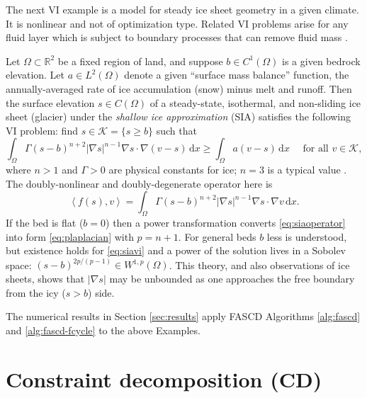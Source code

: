 \documentclass[review,hidelinks,onefignum,onetabnum]{siamart220329}
\newcommand{\RR}{\mathbb{R}}
\newcommand{\grad}{\nabla}
\newcommand{\ip}[2]{\left<#1,#2\right>}
\newcommand{\dx}{\, \mathrm{d}x}
\begin{document}
The next VI example is a model for steady ice sheet geometry in a given climate. It is nonlinear and not of optimization type. Related VI problems arise for any fluid layer which is subject to boundary processes that can remove fluid mass \cite{Bueler2021conservation}.

\begin{example}  \label{ex:sia}  Let $\Omega \subset \RR^2$ be a fixed region of land, and suppose $b \in C^1(\Omega)$ is a given bedrock elevation.  Let $a \in L^2(\Omega)$ denote a given ``surface mass balance'' function, the annually-averaged rate of ice accumulation (snow) minus melt and runoff.  Then the surface elevation $s\in C(\Omega)$ of a steady-state, isothermal, and non-sliding ice sheet (glacier) under the \emph{shallow ice approximation} (SIA) \cite{GreveBlatter2009} satisfies the following VI problem: find $s \in \mathcal{K} = \{s\ge b\}$ such that
\begin{equation}
\int_\Omega \Gamma (s-b)^{n+2} |\grad s|^{n-1} \grad s \cdot \grad (v-s) \dx \ge \int_\Omega a (v-s)\dx \quad \text{ for all } v \in \mathcal{K}, \label{eq:siavi}
\end{equation}
where $n>1$ and $\Gamma>0$ are physical constants for ice; $n=3$ is a typical value \cite{GreveBlatter2009}.  The doubly-nonlinear and doubly-degenerate operator here is
\begin{equation}
\ip{f(s)}{v} = \int_\Omega \Gamma (s-b)^{n+2} |\grad s|^{n-1} \grad s \cdot \grad v\dx. \label{eq:siaoperator}
\end{equation}
If the bed is flat ($b=0$) then a power transformation converts \eqref{eq:siaoperator} into form \eqref{eq:plaplacian} with $p=n+1$.  For general beds $b$ less is understood, but existence holds for \eqref{eq:siavi} \cite{JouvetBueler2012} and a power of the solution lives in a Sobolev space: $(s-b)^{2p/(p-1)} \in W^{1,p}(\Omega)$.  This theory, and also observations of ice sheets, shows that $|\grad s|$ may be unbounded as one approaches the free boundary from the icy ($s>b$) side.
\end{example}

The numerical results in Section \ref{sec:results} apply FASCD Algorithms \ref{alg:fascd} and \ref{alg:fascd-fcycle} to the above Examples.


\section{Constraint decomposition (CD)} \label{sec:cd}
\end{document}
